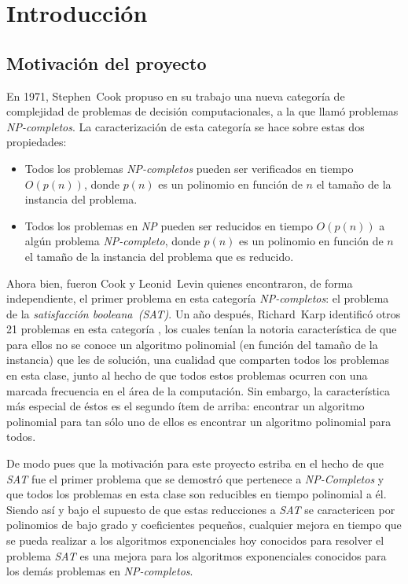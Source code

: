 \documentclass[12pt,lettersize]{article}
\begin{document}
\setlength{\parskip}{2.5mm}
\setlength{\itemsep}{0ex }
\tableofcontents
\section{Introducción}

\subsection{Motivación del proyecto}
En 1971, Stephen~Cook propuso en su trabajo\cite{Cook} una nueva categoría de complejidad
de problemas de decisión computacionales, a la que llamó problemas
\emph{NP-completos}. La caracterización de esta categoría se hace sobre estas
dos propiedades:
\begin{itemize}
  \item Todos los problemas \emph{NP-completos} pueden ser verificados en tiempo
    $O(p(n))$, donde $p(n)$ es un polinomio en función de $n$ el tamaño de la
    instancia del problema. 
  \item Todos los problemas en \emph{NP} pueden ser reducidos en tiempo
    $O(p(n))$ a algún problema \emph{NP-completo}, donde $p(n)$ es un polinomio
    en función de $n$ el tamaño de la instancia del problema que es reducido.
\end{itemize}

Ahora bien, fueron Cook y Leonid~Levin quienes encontraron, de forma
independiente, el primer problema en esta categoría \emph{NP-completos}: el
problema de la \emph{satisfacción booleana~(SAT)}. Un año después, Richard~Karp
identificó otros 21 problemas en esta categoría \cite{Karp}, los cuales tenían
la notoria característica de que para ellos no se conoce un algoritmo polinomial
(en función del tamaño de la instancia) que les de solución, una cualidad que
comparten todos los problemas en esta clase, junto al hecho de que todos estos
problemas ocurren con una marcada frecuencia en el área de la computación. Sin
embargo, la característica más especial de éstos es el segundo ítem de arriba:
encontrar un algoritmo polinomial para tan sólo uno de ellos es encontrar un
algoritmo polinomial para todos.

De modo pues que la motivación para este proyecto estriba en el hecho de que
\emph{SAT} fue el primer problema que se demostró que pertenece a
\emph{NP-Completos} y que todos los problemas en esta clase son reducibles en
tiempo polinomial a él. Siendo así y bajo el supuesto de que estas reducciones a
\emph{SAT} se caractericen por polinomios de bajo grado y coeficientes pequeños,
cualquier mejora en tiempo que se pueda realizar a los algoritmos exponenciales
hoy conocidos para resolver el problema \emph{SAT} es una mejora para los
algoritmos exponenciales conocidos para los demás problemas en
\emph{NP-completos}.
\end{document}
